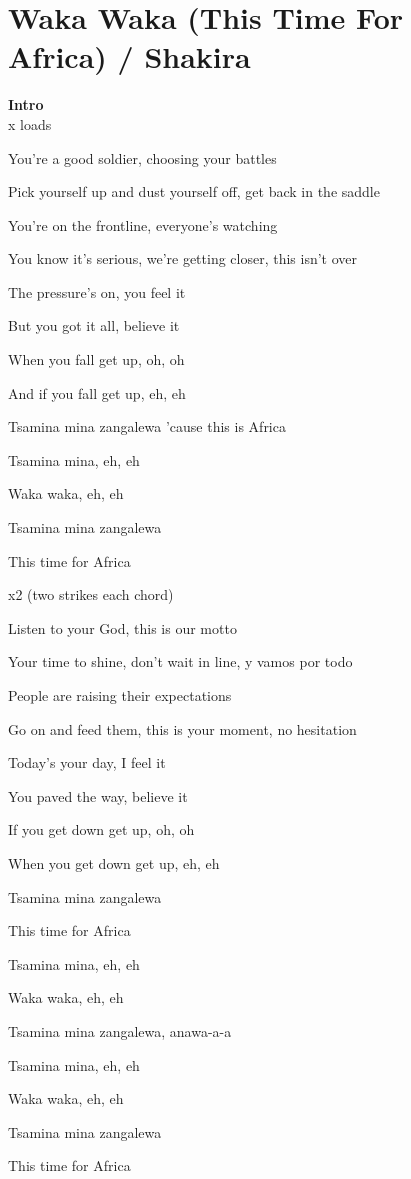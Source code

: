 \section{Waka Waka (This Time For Africa) / Shakira}\label{sec:wakawaka}

  \Cmajor
  \Gmajor
  \Aminor
  \Fmajor
  
  
\textbf{Intro} \\
 x loads

You're a good soldier, choosing your battles

Pick yourself up and dust yourself off, get back in the saddle

You're on the frontline, everyone's watching

You know it's serious, we're getting closer, this isn't over

The pressure's on, you feel it

But you got it all, believe it

When you fall get up, oh, oh

And if you fall get up, eh, eh

Tsamina mina zangalewa 'cause this is Africa

Tsamina mina, eh, eh

Waka waka, eh, eh

Tsamina mina zangalewa

This time for Africa

 x2 (two strikes each chord)

Listen to your God, this is our motto

Your time to shine, don't wait in line, y vamos por todo

People are raising their expectations

Go on and feed them, this is your moment, no hesitation

Today's your day, I feel it

You paved the way, believe it

If you get down get up, oh, oh

When you get down get up, eh, eh

Tsamina mina zangalewa

This time for Africa

Tsamina mina, eh, eh

Waka waka, eh, eh

Tsamina mina zangalewa, anawa-a-a

Tsamina mina, eh, eh

Waka waka, eh, eh

Tsamina mina zangalewa

This time for Africa

